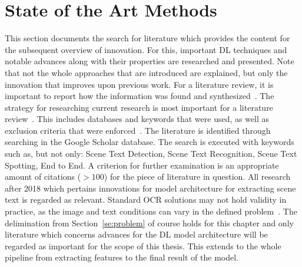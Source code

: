 \section{State of the Art Methods}\label{se:innovations}
This section documents the search for literature which provides the content for the subsequent
overview of innovation.
For this, important \ac{DL} techniques and notable advances along with their properties are researched
and presented.
Note that not the whole approaches that are introduced are explained, but only the innovation that
improves upon previous work.
For a literature review, it is important to report how the information was found and
synthesized~\citep{torraco_writing_2005}.
The strategy for researching current research is most important for a literature
review~\citep{snyder_literature_2019}.
This includes databases and keywords that were used, as well as exclusion criteria that were
enforced~\citep{torraco_writing_2005}.
The literature is identified through searching in the Google Scholar database.
The search is executed with keywords such as, but not only: Scene Text Detection,
Scene Text Recognition, Scene Text Spotting, End to End.
A criterion for further examination is an appropriate amount of citations ($>100$) for the piece of
literature in question.
All research after 2018 which pertains innovations for model architecture for extracting scene
text is regarded as relevant.
Standard \ac{OCR} solutions may not hold validity in practice, as the image and text conditions can
vary in the defined problem~\citep{chen_text_2021}.
The delimination from Section~\ref{se:problem} of course holds for this chapter and only literature
which concerns advances for the \ac{DL} model architecture will be regarded as important for the
scope of this thesis.
This extends to the whole pipeline from extracting features to the final result of the model.

